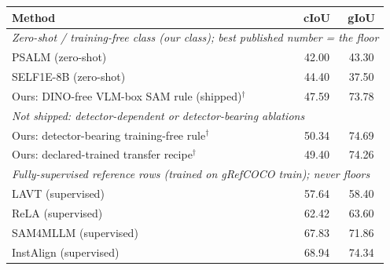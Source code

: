 \begin{tabular}{lcc}
\toprule
Method & cIoU & gIoU \\
\midrule
\multicolumn{3}{l}{\emph{Zero-shot / training-free class (our class); best published number = the floor}} \\
PSALM (zero-shot)~\cite{psalm2024} & 42.00 & 43.30 \\
SELF1E-8B (zero-shot)~\cite{self1e2026} & 44.40 & 37.50 \\
Ours: DINO-free VLM-box SAM rule (shipped)$^\dagger$ & 47.59 & 73.78 \\
\midrule
\multicolumn{3}{l}{\emph{Not shipped: detector-dependent or detector-bearing ablations}} \\
Ours: detector-bearing training-free rule$^\dagger$ & 50.34 & 74.69 \\
Ours: declared-trained transfer recipe$^\dagger$ & 49.40 & 74.26 \\
\midrule
\multicolumn{3}{l}{\emph{Fully-supervised reference rows (trained on gRefCOCO train); never floors}} \\
LAVT (supervised) & 57.64 & 58.40 \\
ReLA (supervised) & 62.42 & 63.60 \\
SAM4MLLM (supervised) & 67.83 & 71.86 \\
InstAlign (supervised)~\cite{instalign2024} & 68.94 & 74.34 \\
\bottomrule
\end{tabular}
